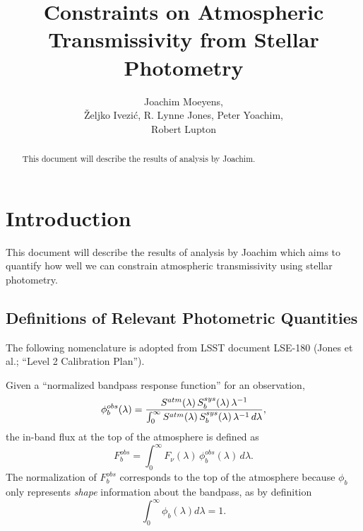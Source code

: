 \documentclass[12pt,preprint]{aastex}
\begin{document}
\title{Constraints on Atmospheric Transmissivity from Stellar Photometry}

\author{
Joachim Moeyens, \\  
{\v Z}eljko Ivezi{\'c},  R. Lynne Jones, Peter Yoachim, \\
Robert Lupton \\
}


\begin{abstract}
This document will describe the results of analysis by Joachim. 
\end{abstract}


\section{Introduction}

This document will describe the results of analysis by Joachim which aims
to quantify how well we can constrain atmospheric transmissivity using stellar photometry. 



\subsection{Definitions of Relevant Photometric Quantities} 

The following nomenclature is adopted from LSST document LSE-180 (Jones et al.; ``Level 2 Calibration Plan''). 

Given a ``normalized bandpass response function'' for an observation,
\begin{equation}
\label{eqn:PhiDef}
   \phi_b^{obs}(\lambda) =  {
     {S^{atm}(\lambda)\, S_b^{sys}(\lambda) \,
       \lambda^{-1}} \over
     \int_0^\infty { {S^{atm}(\lambda) \,
         S_b^{sys}(\lambda) \, \lambda^{-1}} \,d\lambda}},
\end{equation}
the in-band flux at the top of the atmosphere is defined as
\begin{equation}
\label{eqn:Fb}
F_b^{obs} = \int_0^\infty {F_\nu(\lambda) \,\phi_b^{obs}(\lambda) \, d\lambda}.
\end{equation}
The normalization of $F_b^{obs}$ corresponds to the top of the atmosphere because 
$\phi_b$ only represents {\it shape} information about the bandpass, as by definition
\begin{equation}
\int_0^\infty {\phi_b(\lambda)  d\lambda}=1. 
\end{equation}
\end{document}
